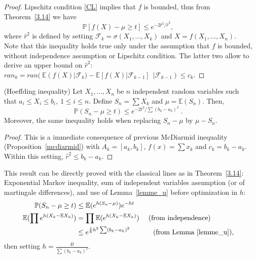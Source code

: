 \begin{proof} Lipschitz condition \eqref{CL} implies that $f$ is bounded, thus from Theorem~\ref{3.14} we have
$$\mathbb{P}\left[f(X)-\mu \geq t\right] \leq e^{-2t^2/\hat r^2},$$ where $\hat r^2$ is defined by setting $\mathcal{F}_k=\sigma(X_1,...,X_k)$ and $X=f(X_1,...,X_n)$.
Note that this inequality holds true only under the assumption that $f$ is bounded, without independence assumption or Lipschitz condition. The latter two allow to derive an upper bound on $\hat r^2$:
$ran_k=ran(~\mathbb{E}(f(X)|\mathcal{F}_k)-\mathbb{E}\left[f(X)|\mathcal{F}_{k-1}\right]~~|\mathcal{F}_{k-1}) \leq c_k$.
\end{proof}


\begin{proposition} ({\sc Hoeffding inequality})
Let $X_1,...,X_n$ be $n$ independent random variables such that $a_i \leq X_i \leq b_i,~1\le i \le n$. Define $S_n=\sum X_k$ and $\mu=\mathbb{E}(S_n)$.
Then, $$\mathbb{P}(S_n-\mu \geq t) \leq e^{-2t^2/\sum(b_k-a_k)^2} ~.$$ Moreover, the same inequality holds when replacing $S_n-\mu$ by $\mu - S_n$.
\end{proposition}

\begin{proof}
 This is a immediate consequence of previous McDiarmid inequality (Proposition~\ref{mcdiarmid}) with $A_k=[a_k,b_k]$, $f(x)=\sum x_k$ and $c_k=b_k-a_k $. Within this setting, $\hat r^2 \leq b_k-a_k$.
\end{proof}

\begin{remark} 
This result can be directly proved with the classical lines as in Theorem~\ref{3.14}: Exponential Markov inequality, sum of independent variables assumption (or of martingale differences), and use of Lemma~\ref{lemme_u} before optimization in $h$:
\begin{align*} 
\mathbb{P}(S_n-\mu \geq t) &\leq \mathbb{E}(e^{h(S_n-\mu)})e^{-ht}\\
\mathbb{E}(\prod e^{h(X_k-\mathbb{E}X_k)})&=\prod \mathbb{E}(e^{h(X_k-\mathbb{E}X_k)})\mbox{~~~~(from independence)}\\
&\leq e^{\frac{1}{8}h^2\sum(b_k-a_k)^2} \mbox{~~~~~~~~~~(from Lemma~\ref{lemme_u})},
\end{align*}
then setting $h=\frac{4t}{\sum(b_k-a_k)^2}$.
\end{remark}

